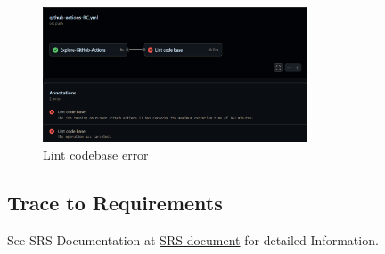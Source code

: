 \documentclass[12pt, titlepage]{article}
\begin{document}
\begin{figure}[h]
  \centering
  \includegraphics[width=0.7\textwidth]{lintCodebaseError.png}
  \caption{Lint codebase error}
  \label{FigUH}
\end{figure}

\newpage

\begin{landscape}
\section{Trace to Requirements}

See SRS Documentation at \href{https://github.com/Inreet-Kaur/capstone/blob/main/docs/SRS/SRS.pdf} {SRS document} for detailed Information.\\


\end{landscape}
\end{document}
